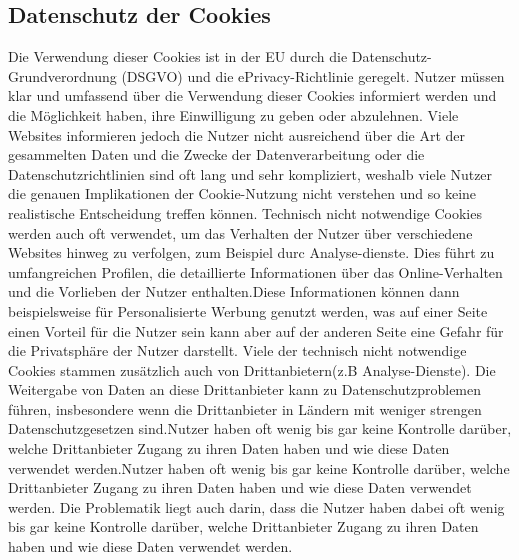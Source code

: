 \documentclass{article}
\begin{document}
\subsection{Datenschutz der Cookies}
Die Verwendung dieser Cookies ist in der EU durch die Datenschutz-Grundverordnung (DSGVO) und die ePrivacy-Richtlinie geregelt. Nutzer müssen klar und umfassend über die Verwendung dieser Cookies informiert werden und die Möglichkeit haben, ihre Einwilligung zu geben oder abzulehnen. Viele Websites informieren jedoch die Nutzer nicht ausreichend über die Art der gesammelten Daten und die Zwecke der Datenverarbeitung oder die Datenschutzrichtlinien sind oft lang und sehr kompliziert, weshalb viele Nutzer die genauen Implikationen der Cookie-Nutzung nicht verstehen und so keine realistische Entscheidung treffen können.
Technisch nicht notwendige Cookies werden auch oft verwendet, um das Verhalten der Nutzer über verschiedene Websites hinweg zu verfolgen, zum Beispiel durc Analyse-dienste. Dies führt zu umfangreichen Profilen, die detaillierte Informationen über das Online-Verhalten und die Vorlieben der Nutzer enthalten.Diese Informationen können dann beispielsweise für Personalisierte Werbung genutzt werden, was auf einer Seite einen Vorteil für die Nutzer sein kann aber auf der anderen Seite eine Gefahr für die Privatsphäre der Nutzer darstellt.
Viele der technisch nicht notwendige Cookies stammen zusätzlich auch von Drittanbietern(z.B Analyse-Dienste). Die Weitergabe von Daten an diese Drittanbieter kann zu Datenschutzproblemen führen, insbesondere wenn die Drittanbieter in Ländern mit weniger strengen Datenschutzgesetzen sind.Nutzer haben oft wenig bis gar keine Kontrolle darüber, welche Drittanbieter Zugang zu ihren Daten haben und wie diese Daten verwendet werden.Nutzer haben oft wenig bis gar keine Kontrolle darüber, welche Drittanbieter Zugang zu ihren Daten haben und wie diese Daten verwendet werden. Die Problematik liegt auch darin, dass die Nutzer haben dabei oft wenig bis gar keine Kontrolle darüber, welche Drittanbieter Zugang zu ihren Daten haben und wie diese Daten verwendet werden. 

\nocite{*}
\printbibliography
\end{document}
